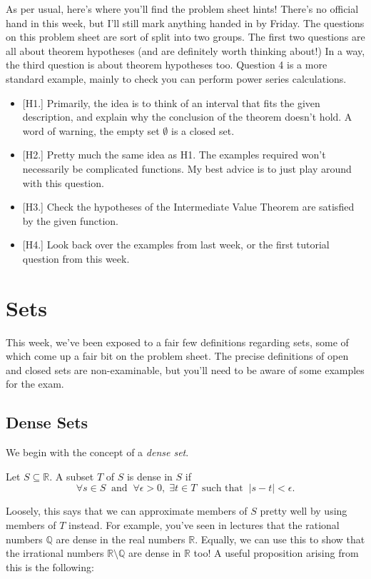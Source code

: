 \documentclass[
  10pt,
  a4paper]{article}
\providecommand{\tightlist}{%
  \setlength{\itemsep}{0pt}\setlength{\parskip}{0pt}}
\theoremstyle{plain}
\theoremstyle{plain}
\theoremstyle{plain}
\theoremstyle{plain}
\theoremstyle{plain}
\theoremstyle{definition}
\theoremstyle{definition}
\theoremstyle{definition}
\theoremstyle{remark}
\let\BeginKnitrBlock\begin \let\EndKnitrBlock\end
\begin{document}
As per usual, here's where you'll find the problem sheet hints! There's no official hand in this week, but I'll still mark anything handed in by Friday. The questions on this problem sheet are sort of split into two groups. The first two questions are all about theorem hypotheses (and are definitely worth thinking about!) In a way, the third question is about theorem hypotheses too. Question 4 is a more standard example, mainly to check you can perform power series calculations.

\begin{itemize}
\tightlist
\item
  {[}H1.{]} Primarily, the idea is to think of an interval that fits the given description, and explain why the conclusion of the theorem doesn't hold. A word of warning, the empty set \(\emptyset\) is a closed set.
\item
  {[}H2.{]} Pretty much the same idea as H1. The examples required won't necessarily be complicated functions. My best advice is to just play around with this question.
\item
  {[}H3.{]} Check the hypotheses of the Intermediate Value Theorem are satisfied by the given function.
\item
  {[}H4.{]} Look back over the examples from last week, or the first tutorial question from this week.
\end{itemize}

\hypertarget{sets}{%
\section{Sets}\label{sets}}

This week, we've been exposed to a fair few definitions regarding sets, some of which come up a fair bit on the problem sheet. The precise definitions of open and closed sets are non-examinable, but you'll need to be aware of some examples for the exam.

\hypertarget{dense-sets}{%
\subsection{Dense Sets}\label{dense-sets}}

We begin with the concept of a \emph{dense set}.
\BeginKnitrBlock{definition}[Dense Set]
{\label{def:def3} }Let \(S \subseteq \mathbb{R}\). A subset \(T\) of \(S\) is dense in \(S\) if \[\forall s \in S \;\;\text{and}\;\; \forall \epsilon > 0,\; \exists t \in T \;\; \text{such that}\;\; \lvert s - t \rvert < \epsilon.\]
\EndKnitrBlock{definition}
Loosely, this says that we can approximate members of \(S\) pretty well by using members of \(T\) instead. For example, you've seen in lectures that the rational numbers \(\mathbb{Q}\) are dense in the real numbers \(\mathbb{R}\). Equally, we can use this to show that the irrational numbers \(\mathbb{R}\setminus\mathbb{Q}\) are dense in \(\mathbb{R}\) too! A useful proposition arising from this is the following:
\end{document}
